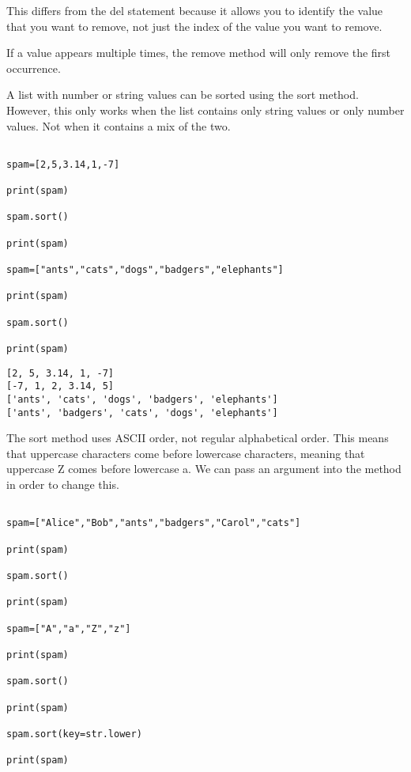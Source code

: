 \documentclass[11pt]{article}
\begin{document}
This differs from the del statement because it allows you to identify the value that you want to remove, not just the index of the value you want to remove.

If a value appears multiple times, the remove method will only remove the first occurrence.

A list with number or string values can be sorted using the sort method. However, this only works when the list contains only string values or only number values. Not when it contains a mix of the two.

\begin{verbatim}

spam=[2,5,3.14,1,-7]

print(spam)

spam.sort()

print(spam)

spam=["ants","cats","dogs","badgers","elephants"]

print(spam)

spam.sort()

print(spam)

\end{verbatim}

\begin{verbatim}
[2, 5, 3.14, 1, -7]
[-7, 1, 2, 3.14, 5]
['ants', 'cats', 'dogs', 'badgers', 'elephants']
['ants', 'badgers', 'cats', 'dogs', 'elephants']
\end{verbatim}



The sort method uses ASCII order, not regular alphabetical order. This means that uppercase characters come before lowercase characters, meaning that uppercase Z comes before lowercase a. We can pass an argument into the method in order to change this.

\begin{verbatim}

spam=["Alice","Bob","ants","badgers","Carol","cats"]

print(spam)

spam.sort()

print(spam)

spam=["A","a","Z","z"]

print(spam)

spam.sort()

print(spam)

spam.sort(key=str.lower)

print(spam)

\end{verbatim}
\end{document}
